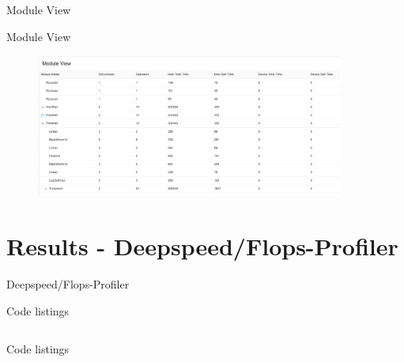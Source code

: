 \documentclass[compress,aspectratio=169]{beamer}
\begin{document}
\begin{frame}
\begin{center}
Module View
\end{center}
\end{frame}

\begin{frame}{Module View}
    \vspace{-1em}
\begin{center}
    \begin{figure}
        \includegraphics[width=0.9\textwidth]{../../data/scap_gtx1080_profiler-torch_batch-size-64_14650758_module-view}
    \end{figure}
    \end{center}
\end{frame}


\section{Results - Deepspeed/Flops-Profiler}

\begin{frame}
Deepspeed/Flops-Profiler
\end{frame}

\begin{frame}[fragile]{Code listings}
        \footnotesize\inputminted[xleftmargin=1em,linenos,fontsize=\scriptsize, firstline=1,lastline=16]{python}{../../data/scap_gtx1080_deepspeed_14615344_4294967294_one-epoch.txt}

\end{frame}

\begin{frame}[fragile]{Code listings}
        \footnotesize\inputminted[xleftmargin=1em,linenos,fontsize=\scriptsize, firstline=18,lastline=31]{python}{../../data/scap_gtx1080_deepspeed_14615344_4294967294_one-epoch.txt}

\end{frame}
\end{document}
